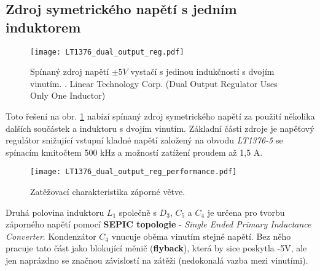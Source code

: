     \subsection{Zdroj symetrického napětí s jedním induktorem}
      \begin{figure}[ht!]
        \centering
        \texttt{[image: LT1376\_dual\_output\_reg.pdf]}
        \caption[Spínaný zdroj napětí $\pm5 V$ vystačí s jedinou indukčností s dvojím
                 vinutím]{Spínaný zdroj napětí $\pm5 V$ vystačí s jedinou indukčností s dvojím
                 vinutím. \cite{DN100}. Linear Technology Corp. (Dual Output Regulator Uses Only
                 One Inductor)}
        \label{enz:fig_LT1376_cir1}
      \end{figure}
      Toto řešení na obr. \ref{enz:fig_LT1376_cir1} nabízí spínaný zdroj symetrického napětí za
      použití několika dalších součástek a induktoru s dvojím vinutím. Základní části zdroje je
      napěťový regulátor snižující vstupní kladné napětí založený na obvodu \emph{LT1376-5} se
      spínacím kmitočtem 500 kHz a možností zatížení proudem až 1,5 A.

      \begin{figure}[ht!]
        \centering
        \texttt{[image: LT1376\_dual\_output\_reg\_performance.pdf]}
        \caption{Zatěžovací charakteristika záporné větve.}
        \label{enz:fig_LT1376_cir1_perform}
      \end{figure}

      Druhá polovina induktoru $L_1$ společně s $D_3$, $C_5$ a $C_4$ je určena pro tvorbu
      záporného napětí pomocí \textbf{SEPIC topologie} - \emph{Single Ended Primary Inductance
      Converter}. Kondenzátor $C_4$ vnucuje oběma vinutím stejné napětí. Bez něho pracuje tato
      část jako blokující měnič (\textbf{flyback}), která by sice poskytla -5V, ale jen naprázdno
      se značnou závislostí na zátěži (nedokonalá vazba mezi vinutími).

\printbibliography[title={Seznam literatury}, heading=subbibliography]
